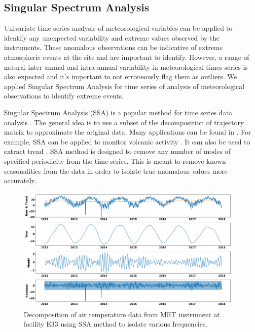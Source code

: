 \subsection{Singular Spectrum Analysis}
Univariate time series analysis of meteorological variables can be
applied to identify any unexpected variability and extreme values
observed by the instruments. These anomalous observations can be
indicative of extreme atmospheric events at the site and are important
to identify. However, a range of natural inter-annual and intra-annual variability in
meteorological times series is also expected and it's important to not
erroneously flag them as outliers. We applied Singular Spectrum Analysis
for time series of analysis of meteorological observations to identify
extreme events.

Singular Spectrum Analysis (SSA) is a popular method for time series
data analysis \cite{golyandina2013singular,golyandina2014basic}. The
general idea is to use a subset of the decomposition of trajectory
matrix to approximate the original data. Many applications can be found
in \cite{golyandina2013singular}. For example, SSA can be applied to
monitor volcanic activity \cite{bozzo2010relationship}. It can also be
used to extract trend \cite{alexandrov2008method}. SSA method is designed
to remove any number of modes of specified periodicity from the time
series. This is meant to remove known seasonalities from the data in 
order to isolate true anomalous values more accurately. 

\begin{figure}[ht]
    \centering
    \includegraphics[width=\textwidth]{figures/E33.png}
    \caption{Decomposition of air temperature data from MET
		instrument at facility E33 using SSA method to isolate various
			frequencies.}
    \label{fig:ssa}
\end{figure}

